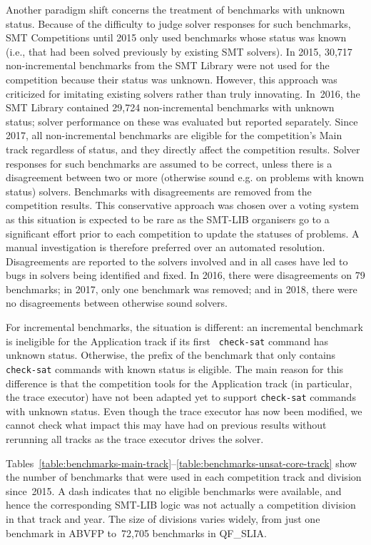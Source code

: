 \documentclass[dvipsnames,table,twoside,11pt]{article}
\begin{document}
Another paradigm shift concerns the treatment of benchmarks with
unknown status.  Because of the difficulty to judge solver responses
for such benchmarks, SMT Competitions until 2015 only used benchmarks
whose status was known (i.e., that had been solved previously by
existing SMT solvers).  In 2015, 30,717 non-incremental benchmarks
from the SMT Library were not used for the competition because their
status was unknown.  However, this approach was criticized for
imitating existing solvers rather than truly innovating.  In~2016,
the SMT Library contained 29,724 non-incremental benchmarks with
unknown status; solver performance on these was evaluated but reported
separately.  Since 2017, all non-incremental benchmarks are eligible
for the competition's Main track regardless of status, and they
directly affect the competition results.  Solver responses for such
benchmarks are assumed to be correct, unless there is a disagreement
between two or more (otherwise sound e.g. on problems with known status) solvers.  Benchmarks with
disagreements are removed from the competition results.  This conservative approach was chosen over a voting system as this situation is expected to be rare as the SMT-LIB organisers go to a significant effort prior to each competition to update the statuses of problems. A manual investigation is therefore preferred over an automated resolution. Disagreements are reported to the solvers involved and in all cases have led to bugs in solvers being identified and fixed. 
In 2016,
there were disagreements on 79 benchmarks; in 2017, only one benchmark
was removed; and in 2018, there were no disagreements between
otherwise sound solvers. 


For incremental benchmarks, the situation is different: an incremental
benchmark is ineligible for the Application track if its first {\tt
  check-sat} command has unknown status.  Otherwise, the prefix of the
benchmark that only contains {\tt check-sat} commands with known
status is eligible.  The main reason for this difference is that the
competition tools for the Application track (in particular, the trace
executor) have not been adapted yet to support {\tt check-sat}
commands with unknown status. Even though the trace executor has now been modified, we cannot check what impact this may have had on previous results without rerunning all tracks as the trace executor drives the solver.

Tables~\ref{table:benchmarks-main-track}--\ref{table:benchmarks-unsat-core-track}
show the number of benchmarks that were used in each competition track
and division since~2015.  A dash indicates that no eligible benchmarks
were available, and hence the corresponding SMT-LIB logic was not
actually a competition division in that track and year.  The size of
divisions varies widely, from just one benchmark in ABVFP to~72,705
benchmarks in QF\_SLIA.
\end{document}
